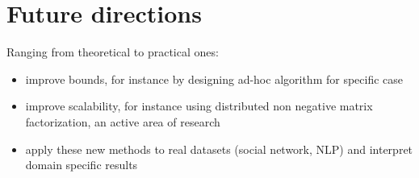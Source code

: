 \section{Future directions}
Ranging from theoretical to practical ones:

\begin{itemize}
	\item improve bounds, for instance by designing ad-hoc algorithm for
		specific case
	\item improve scalability, for instance using distributed non negative
		matrix factorization, an active area of research
		\autocite{Bhojanapalli2014,Hastie2014,Udell2014}
	\item apply these new methods to real datasets (social network, NLP) and
		interpret domain specific results
\end{itemize}
